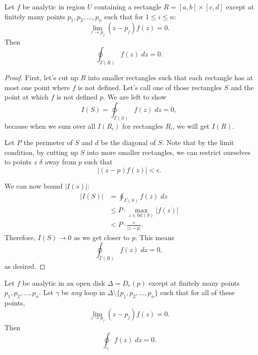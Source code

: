 \begin{theorem} 
    Let $f$ be analytic in region $U$ containing a rectangle
    $R = [a,b] \times [c,d]$ except at finitely many points
    $p_1, p_2, \ldots, p_n$ such that for $1 \le i \le n$:
    \[ \lim_{z \to p_j} (z-p_j) f(z) = 0.\]
    Then
    \[ \oint_{\Gamma(R)} f(z) \; dz = 0. \]
\end{theorem}

\begin{proof}
    First, let's cut up $R$ into smaller rectangles such
    that each rectangle has at most one point
    where $f$ is not defined.
    Let's call one of those rectangles $S$ and the point
    at which $f$ is not defined $p$.
    We are left to show
    \[ I(S) = \oint_{\Gamma(S)} f(z) \; dz = 0, \]
    because when we sum over all $I(R_i)$ for
    rectangles $R_i$, we will get $I(R)$.

    \noindent
    Let $P$ the perimeter of $S$ and $d$ be the diagonal
    of $S$.
    Note that by the limit condition, by cutting 
    up $S$ into more smaller rectangles, 
    we can restrict ourselves to points $z$ $\delta$
    away from $p$ such that
    \[ |(z-p)f(z)| < \epsilon. \tag{1} \]

    We can now bound $|I(s)|$:
    \begin{align*}
        |I(S)| &= \oint_{\Gamma(S)} f(z) \; dz \\
        &\le P \cdot \max_{z \in \text{bd}(S)} |f(z)| 
        \tag{ML Theorem}\\
        &< P \cdot \frac{\epsilon}{|z-p|}.
    \end{align*}
    Therefore, $I(S) \to 0$ as we get closer to $p$.
    This means
    \[ \oint_{\Gamma(R)} f(z) \; dz = 0, \]
    as desired.
\end{proof}

\begin{theorem}
    Let $f$ be analytic in an open disk $\Delta = D_r(p)$
    except at finitely many points $p_1, p_2, \ldots, p_n$.
    Let $\gamma$ be \textit{any} loop in $\Delta \setminus 
    \{ p_1, p_2, \ldots, p_n \}$ such that for all of these points,
    \[ \lim_{z \to p_j} (z-p_j)f(z) = 0.\]
    Then
    \[ \oint_{\gamma} f(z) \; dz = 0. \]
\end{theorem}

